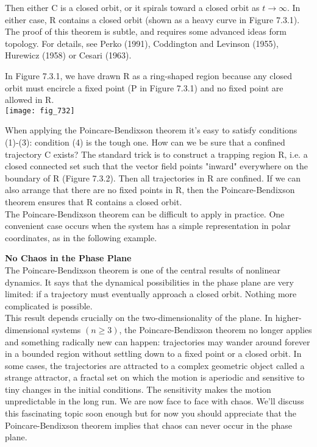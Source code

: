 \documentclass{article}
\newcommand\tab[1][1cm]{\hspace*{#1}}
\begin{document}
Then either C is a closed orbit, or it spirals toward a closed orbit as $t \to \infty$. In either case, R contains a closed orbit (shown as a heavy curve in Figure 7.3.1). \\ \tab The proof of this theorem is subtle, and requires some advanced ideas form topology. For details, see Perko (1991), Coddington and Levinson (1955), Hurewicz (1958) or Cesari (1963). \\ \tab

 In Figure 7.3.1, we have drawn R as a ring-shaped region because any closed orbit must encircle a fixed point (P in Figure 7.3.1) and no fixed point are allowed in R. \\
\texttt{[image: fig\_732]}

When applying the Poincare-Bendixson theorem it's easy to satisfy conditions (1)-(3): condition (4) is the tough one. How can we be sure that a confined trajectory C exists? The standard trick is to construct a trapping region R, i.e. a closed connected set such that the vector field points "inward" everywhere on the boundary of R (Figure 7.3.2). Then all trajectories in R are confined. If we can also arrange that there are no fixed points in R, then the Poincare-Bendixson theorem ensures that R contains a closed orbit. \\ \tab
The Poincare-Bendixson theorem can be difficult to apply in practice. One convenient case occurs when the system has a simple representation in polar coordinates, as in the following example.

\textbf {No Chaos in the Phase Plane} \\ \tab
The Poincare-Bendixson theorem is one of the central results of nonlinear dynamics. It says that the dynamical possibilities in the phase plane are very limited: if a trajectory must eventually approach a closed orbit. Nothing more complicated is possible. \\ \tab
This result depends crucially on the two-dimensionality of the plane. In higher-dimensional systems $(n \geq 3)$, the Poincare-Bendixson theorem no longer applies and something radically new can happen: trajectories may wander around forever in a bounded region without settling down to a fixed point or a closed orbit. In some cases, the trajectories are attracted to a complex geometric object called a strange attractor, a fractal set on which the motion is aperiodic and sensitive to tiny changes in the initial conditions. The sensitivity makes the motion unpredictable in the long run. We are now face to face with chaos. We'll discuss this fascinating topic soon enough but for now you should appreciate that the Poincare-Bendixson theorem implies that chaos can never occur in the phase plane. 
\end{document}
